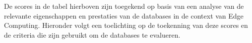     De scores in de tabel hierboven zijn toegekend op basis van een analyse van de relevante eigenschappen en prestaties van de databases in de context van Edge Computing. Hieronder volgt een toelichting op de toekenning van deze scores en de criteria die zijn gebruikt om de databases te evalueren.






